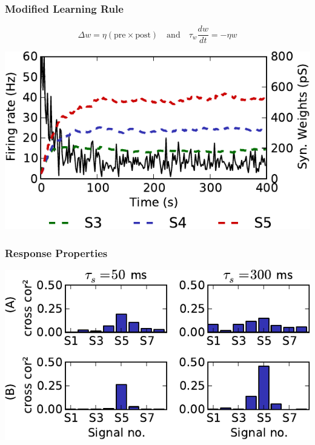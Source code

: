 \documentclass{beamer}
\begin{document}
\begin{frame} \frametitle{Modified Learning Rule}
    \begin{equation*}
        \Delta w = \eta(\text{pre} \times \text{post})
        \quad\text{and}\quad
        \tau_w \frac{dw}{dt} = -\eta w
    \end{equation*}
    \begin{center}
        \includegraphics[width=\textwidth]{figures/evo_exp_decay}
    \end{center}
\end{frame}

\begin{frame} \frametitle{Response Properties}
    \begin{center}
        \includegraphics[width=\textwidth]{figures/correlations}
    \end{center}
\end{frame}
\end{document}
